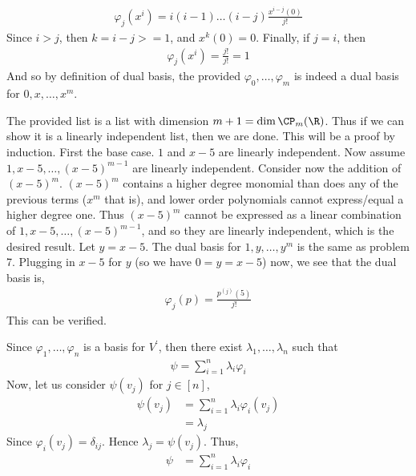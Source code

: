 \documentclass{book}
\begin{document}
\begin{enumerate}[label=\arabic*)]
      \begin{align*}
        \varphi_j(x^i) = i(i - 1)\dots(i - j)\frac{x^{i - j}(0)}{j!} 
      \end{align*}
      Since $i > j$, then $k = i - j >= 1$, and $x^k(0) = 0$. Finally, if $j = i$, then
      \begin{align*}
        \varphi_j(x^i) = \frac{j!}{j!} = 1
      \end{align*}
      And so by definition of dual basis, the provided $\varphi_0, \dots, \varphi_m$ is indeed a dual basis for $0, x, \dots, x^m$.
    \ii
    \begin{enumerate}[label=\alph*)]
      \ii 
        The provided list is a list with dimension $m + 1 = \dim\CP_m(\R)$. Thus if we can show it is a linearly independent list, then we are done. This will be a proof by induction. First
        the base case. $1$ and $x - 5$ are linearly independent. Now assume $1, x - 5, \dots, (x - 5)^{m - 1}$ are linearly independent. Consider now the addition of $(x - 5)^m$. $(x - 5)^m$
        contains a higher degree monomial than does any of the previous terms ($x^m$ that is), and lower order polynomials cannot express/equal a higher degree one. Thus $(x - 5)^m$ cannot be
        expressed as a linear combination of $1, x - 5, \dots, (x - 5)^{m - 1}$, and so they are linearly independent, which is the desired result.
      \ii
        Let $y = x - 5$. The dual basis for $1, y, \dots, y^m$ is the same as problem 7. Plugging in $x - 5$ for $y$ (so we have $0 = y = x - 5$) now, we see that the dual basis is,
        \begin{align*}
          \varphi_j(p) = \frac{p^{(j)}(5)}{j!}
        \end{align*}
        This can be verified.
    \end{enumerate}
    \ii
      Since $\varphi_1, \dots, \varphi_n$ is a basis for $V^{\prime}$, then there exist $\lambda_1, \dots, \lambda_n$ such that
      \begin{align*}
        \psi = \sum_{i = 1}^{n}\lambda_i\varphi_i
      \end{align*}
      Now, let us consider $\psi(v_j)$ for $j \in [n]$,
      \begin{align*}
        \psi(v_j) & = \sum_{i = 1}^{n}\lambda_i\varphi_i(v_j) \\
        & = \lambda_j
      \end{align*}
      Since $\varphi_i(v_j) = \delta_{ij}$. Hence $\lambda_j = \psi(v_j)$. Thus,
      \begin{align*}
        \psi & = \sum_{i = 1}^{n}\lambda_i\varphi_i \\

\end{align*}
\end{enumerate}
\end{document}
